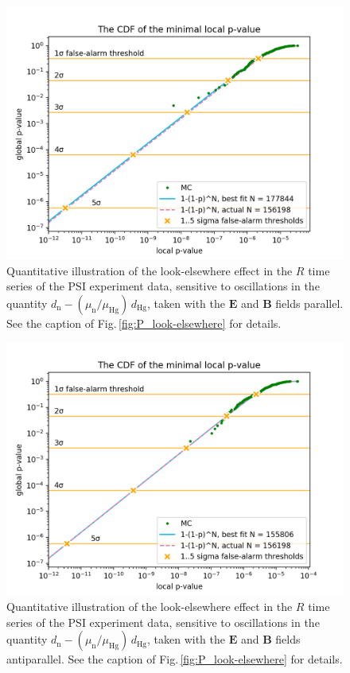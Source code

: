 \begin{figure}[h!]
  \centering
  \includegraphics[width=0.9\linewidth]{gfx/axions/P_look-elsewhere.png}
  \caption{Quantitative illustration of the look-elsewhere effect in the $R$ time series of the PSI experiment data, sensitive to oscillations in the quantity $d_\mathrm{n} - \left( \mu_\mathrm{n} / \mu_\mathrm{Hg} \right) \, d_\mathrm{Hg}$, taken with the $\mathbf{E}$ and $\mathbf{B}$ fields parallel. See the caption of Fig.\,\ref{fig:P_look-elsewhere} for details.}\label{fig:app_P_look_elsewhere}
\end{figure}

\begin{figure}[h!]
  \centering
  \includegraphics[width=0.9\linewidth]{gfx/axions/AP_look-elsewhere.png}
  \caption{Quantitative illustration of the look-elsewhere effect in the $R$ time series of the PSI experiment data, sensitive to oscillations in the quantity $d_\mathrm{n} - \left( \mu_\mathrm{n} / \mu_\mathrm{Hg} \right) \, d_\mathrm{Hg}$, taken with the $\mathbf{E}$ and $\mathbf{B}$ fields antiparallel. See the caption of Fig.\,\ref{fig:P_look-elsewhere} for details.}\label{fig:app_AP_look_elsewhere}
\end{figure}

